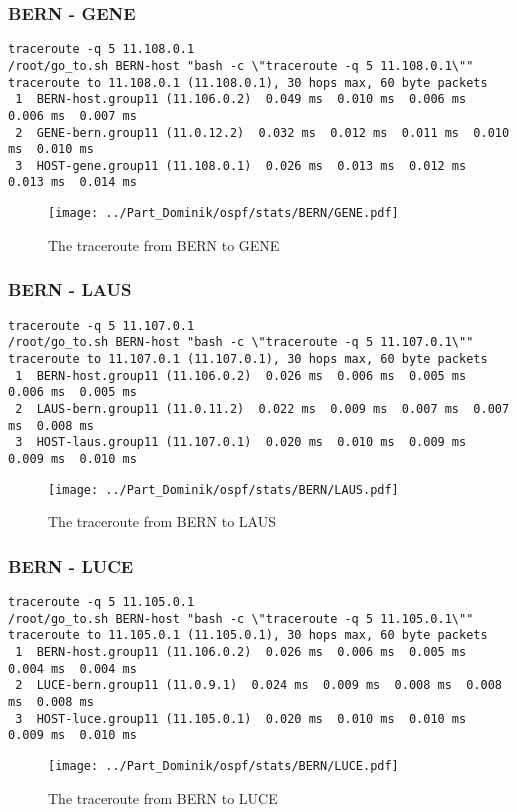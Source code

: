 \clearpage
\subsubsection{BERN - GENE}
\begin{lstlisting}
traceroute -q 5 11.108.0.1
/root/go_to.sh BERN-host "bash -c \"traceroute -q 5 11.108.0.1\""
traceroute to 11.108.0.1 (11.108.0.1), 30 hops max, 60 byte packets
 1  BERN-host.group11 (11.106.0.2)  0.049 ms  0.010 ms  0.006 ms  0.006 ms  0.007 ms
 2  GENE-bern.group11 (11.0.12.2)  0.032 ms  0.012 ms  0.011 ms  0.010 ms  0.010 ms
 3  HOST-gene.group11 (11.108.0.1)  0.026 ms  0.013 ms  0.012 ms  0.013 ms  0.014 ms
\end{lstlisting}
\begin{figure}[H]
\centering
\texttt{[image: ../Part\_Dominik/ospf/stats/BERN/GENE.pdf]}
\caption{The traceroute from BERN to GENE}
\end{figure}
\clearpage
\subsubsection{BERN - LAUS}
\begin{lstlisting}
traceroute -q 5 11.107.0.1
/root/go_to.sh BERN-host "bash -c \"traceroute -q 5 11.107.0.1\""
traceroute to 11.107.0.1 (11.107.0.1), 30 hops max, 60 byte packets
 1  BERN-host.group11 (11.106.0.2)  0.026 ms  0.006 ms  0.005 ms  0.006 ms  0.005 ms
 2  LAUS-bern.group11 (11.0.11.2)  0.022 ms  0.009 ms  0.007 ms  0.007 ms  0.008 ms
 3  HOST-laus.group11 (11.107.0.1)  0.020 ms  0.010 ms  0.009 ms  0.009 ms  0.010 ms
\end{lstlisting}
\begin{figure}[H]
\centering
\texttt{[image: ../Part\_Dominik/ospf/stats/BERN/LAUS.pdf]}
\caption{The traceroute from BERN to LAUS}
\end{figure}
\clearpage
\subsubsection{BERN - LUCE}
\begin{lstlisting}
traceroute -q 5 11.105.0.1
/root/go_to.sh BERN-host "bash -c \"traceroute -q 5 11.105.0.1\""
traceroute to 11.105.0.1 (11.105.0.1), 30 hops max, 60 byte packets
 1  BERN-host.group11 (11.106.0.2)  0.026 ms  0.006 ms  0.005 ms  0.004 ms  0.004 ms
 2  LUCE-bern.group11 (11.0.9.1)  0.024 ms  0.009 ms  0.008 ms  0.008 ms  0.008 ms
 3  HOST-luce.group11 (11.105.0.1)  0.020 ms  0.010 ms  0.010 ms  0.009 ms  0.010 ms
\end{lstlisting}
\begin{figure}[H]
\centering
\texttt{[image: ../Part\_Dominik/ospf/stats/BERN/LUCE.pdf]}
\caption{The traceroute from BERN to LUCE}
\end{figure}
\clearpage
